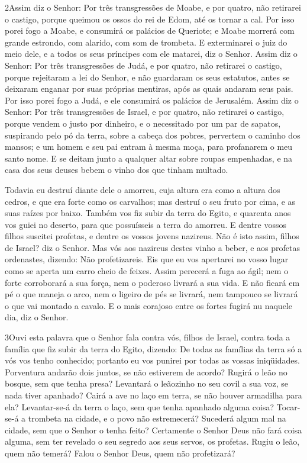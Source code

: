 \lettrine{2} Assim diz o Senhor: Por três transgressões de
Moabe, e por quatro, não retirarei o castigo, porque queimou os
ossos do rei de Edom, até os tornar a cal. Por isso porei fogo a
Moabe, e consumirá os palácios de Queriote; e Moabe morrerá com
grande estrondo, com alarido, com som de trombeta. E
exterminarei o juiz do meio dele, e a todos os seus príncipes com
ele matarei, diz o Senhor. Assim diz o Senhor: Por três
transgressões de Judá, e por quatro, não retirarei o castigo, porque
rejeitaram a lei do Senhor, e não guardaram os seus estatutos, antes
se deixaram enganar por suas próprias mentiras, após as quais
andaram seus pais. Por isso porei fogo a Judá, e ele consumirá
os palácios de Jerusalém. Assim diz o Senhor: Por três
transgressões de Israel, e por quatro, não retirarei o castigo,
porque vendem o justo por dinheiro, e o necessitado por um par de
sapatos, suspirando pelo pó da terra, sobre a cabeça dos pobres,
pervertem o caminho dos mansos; e um homem e seu pai entram à mesma
moça, para profanarem o meu santo nome. E se deitam junto a
qualquer altar sobre roupas empenhadas, e na casa dos seus deuses
bebem o vinho dos que tinham multado.

Todavia eu destruí diante dele o amorreu, cuja altura era como a
altura dos cedros, e que era forte como os carvalhos; mas destruí o
seu fruto por cima, e as suas raízes por baixo. Também vos
fiz subir da terra do Egito, e quarenta anos vos guiei no deserto,
para que possuísseis a terra do amorreu. E dentre vossos
filhos suscitei profetas, e dentre os vossos jovens nazireus. Não é
isto assim, filhos de Israel? diz o Senhor. Mas vós aos
nazireus destes vinho a beber, e aos profetas ordenastes, dizendo:
Não profetizareis. Eis que eu vos apertarei no vosso lugar
como se aperta um carro cheio de feixes. Assim perecerá a
fuga ao ágil; nem o forte corroborará a sua força, nem o poderoso
livrará a sua vida. E não ficará em pé o que maneja o arco,
nem o ligeiro de pés se livrará, nem tampouco se livrará o que vai
montado a cavalo. E o mais corajoso entre os fortes fugirá nu
naquele dia, diz o Senhor.

\medskip

\lettrine{3} Ouvi esta palavra que o Senhor fala contra vós,
filhos de Israel, contra toda a família que fiz subir da terra do
Egito, dizendo: De todas as famílias da terra só a vós vos tenho
conhecido; portanto eu vos punirei por todas as vossas iniqüidades.
Porventura andarão dois juntos, se não estiverem de acordo?
Rugirá o leão no bosque, sem que tenha presa? Levantará o
leãozinho no seu covil a sua voz, se nada tiver apanhado? Cairá
a ave no laço em terra, se não houver armadilha para ela?
Levantar-se-á da terra o laço, sem que tenha apanhado alguma coisa?
Tocar-se-á a trombeta na cidade, e o povo não estremecerá?
Sucederá algum mal na cidade, sem que o Senhor o tenha feito?
Certamente o Senhor Deus não fará coisa alguma, sem ter revelado
o seu segredo aos seus servos, os profetas. Rugiu o leão, quem
não temerá? Falou o Senhor Deus, quem não profetizará?

